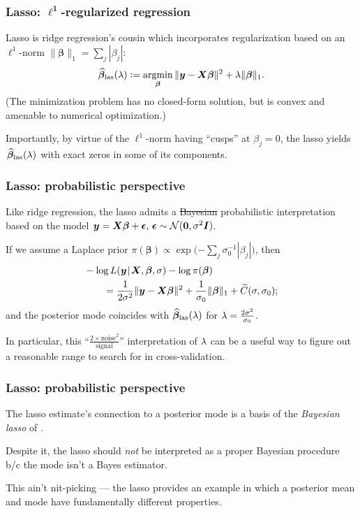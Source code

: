 \documentclass[18pt]{beamer}
\newcommand{\defineTightSpacing}{%
	\setlength{\abovedisplayskip}{.25\baselineskip}%
	\setlength{\belowdisplayskip}{.25\baselineskip}%
}
\newcommand{\given}{\thinnerspace | \thinnerspace}
\newcommand{\defeq}{\vcentcolon =} %
\DeclareMathOperator*{\argmin}{argmin}
\newcommand{\thinnerspace}{\mskip.5\thinmuskip}
\newcommand{\iidSim}{\mathrel{\raisebox{-.3ex}{$\overset{\text{i.i.d.}}{\sim}$}}}
\newcommand{\normalDist}{\mathcal{N}}
\newcommand{\density}{\pi}
\newcommand{\likelihood}{L}
\newcommand{\by}{\bm{y}}
\newcommand{\bX}{\bm{X}}
\newcommand{\bbeta}{\bm{\beta}}
\newcommand{\Id}{\bm{I}}
\begin{document}
\begin{frame}
\frametitle{Lasso: $\bm{\ell^1}$-regularized regression}
Lasso is ridge regression's cousin which incorporates regularization based on an $\ell^1$-norm $\| \bbeta \|_1 = \sum_j | \beta_j |$: 
\begin{equation*} \defineTightSpacing%
\widehat{\bbeta}_{\mathrm{las}}(\penaltyParam)
	\defeq \argmin_{\bbeta} \| \by - \bX \bbeta \|^2 + \penaltyParam \| \bbeta \|_1.
\end{equation*}
(The minimization problem has no closed-form solution, but is convex and amenable to numerical optimization.)

\smallskip
Importantly, by virtue of the $\ell^1$-norm having ``cusps'' at $\beta_j = 0$, the lasso yields $\thinnerspace \widehat{\bbeta}_{\mathrm{las}}(\penaltyParam) \thinnerspace$ with exact zeros in some of its components. 
\end{frame}

\newcommand{\laplaceDist}{\mathrm{Laplace}}
\begin{frame}
\frametitle{Lasso: probabilistic perspective}
Like ridge regression, the lasso admits a \st{Bayesian} probabilistic interpretation based on the model $\thinnerspace \by = \bX \bbeta + \bm{\epsilon}, \, \bm{\epsilon} \sim \normalDist(\bm{0}, \sigma^2 \Id)$.

\smallskip
If we assume a Laplace prior $\density(\bbeta) \propto \exp\!\big( {- \sum_j} \sigma_0^{-1} | \beta_j | \big)$, then %
\begin{equation*} \defineTightSpacing%
\begin{aligned}
&- \log \likelihood(\by \given \bX, \bbeta, \sigma) - \log \density(\bbeta)\\
	&\hspace*{2em}= \frac{1}{2 \sigma^2} \| \by - \bX \bbeta \|^2 + \frac{1}{\sigma_0} \| \bbeta \|_1 + \widetilde{C}(\sigma, \sigma_0);
\end{aligned}
\end{equation*}
and the posterior mode coincides with $\widehat{\bbeta}_{\mathrm{las}}(\penaltyParam)$ for $\lambda = \frac{2 \sigma^2}{\sigma_0}$.

\smallskip
In particular, this ``$\frac{2 \times \mathrm{noise}^2}{\mathrm{signal}}$'' interpretation of $\lambda$ can be a useful way to figure out a reasonable range to search for in cross-validation.
\end{frame}


\begin{frame}
\frametitle{Lasso: probabilistic perspective}
The lasso estimate's connection to a posterior mode is a basis of the \textit{Bayesian lasso} of \cite{park2008bayesian_lasso}.

\smallskip
Despite it, the lasso should \textit{not} be interpreted as a proper Bayesian procedure b/c the mode isn't a Bayes estimator.

\smallskip
This ain't nit-picking --- the lasso provides an example in which a posterior mean and mode have fundamentally different properties.
\end{frame}
\end{document}
